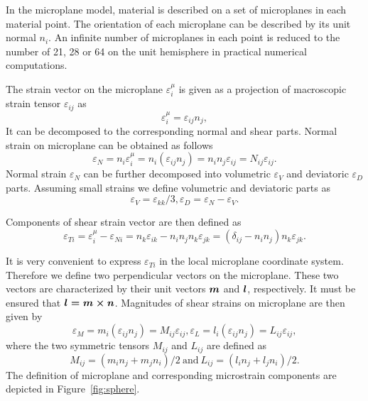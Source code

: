 In the microplane model, material is described on  a set of microplanes in each material point.
The orientation of each microplane can be described by its unit normal $n_i$. 
An infinite number of microplanes in each point is reduced to the number of 21, 28 or 64 on the unit hemisphere 
in practical numerical computations.

The strain vector on the microplane $\varepsilon_i^\mu$ is given as a projection of macroscopic strain tensor $\varepsilon_{ij}$ as 
\begin{equation}
\label{em}
\varepsilon_i^\mu= \varepsilon_{ij} n_j,
\end{equation}
It can be decomposed to the corresponding normal and shear parts. Normal strain on microplane can be obtained as follows
\begin{equation}
\label{en}
\varepsilon_N= n_i \varepsilon_i^\mu=n_i \left( \varepsilon_{ij} n_j \right)=n_i n_j \varepsilon_{ij}=N_{ij} \varepsilon_{ij}.
\end{equation}
Normal strain $\varepsilon_N$ can be further decomposed into volumetric $\varepsilon_V$  and deviatoric
$\varepsilon_D$ parts. Assuming small strains we define volumetric and deviatoric parts as
\begin{equation}
\label{ev,ed}
\varepsilon_V=\varepsilon_{kk} / 3, \varepsilon_D=\varepsilon_{N} - \varepsilon_V.
\end{equation}

Components of shear strain vector are then defined as
\begin{equation}
\label{et}
\varepsilon_{Ti} = \varepsilon_i^\mu - \varepsilon_{Ni} = n_k \varepsilon_{ik} - n_i n_j n_k \varepsilon_{jk} =
\left(\delta_{ij} - n_i n_j \right) n_k \varepsilon_{jk}.
\end{equation}

It is very convenient to express $\varepsilon_{Ti}$ in the local microplane coordinate system.
 Therefore we define two perpendicular vectors on the microplane. 
These two vectors are characterized by their unit vectors $\mbox{\boldmath$m$}$ and $\mbox{\boldmath$l$}$, respectively. It must be ensured
that $\mbox{\boldmath$l = m \times n$}$. Magnitudes of shear strains on microplane are then given by
\begin{equation}
\label{eM,eL}
\varepsilon_M= m_i\left( \varepsilon_{ij} n_j \right)=M_{ij} \varepsilon_{ij},
\varepsilon_L= l_i\left( \varepsilon_{ij} n_j \right)=L_{ij} \varepsilon_{ij},
\end{equation}
where the two symmetric tensors $M_{ij}$  and $L_{ij}$ are defined as
\begin{equation}
\label{M}
M_{ij}=\left(m_i n_j + m_j n_i \right)/2 \ \mbox{and} \
 L_{ij}=\left(l_i n_j + l_j n_i \right)/2.
\end{equation}
The definition of microplane and corresponding microstrain components are depicted in Figure~\ref{fig:sphere}.

